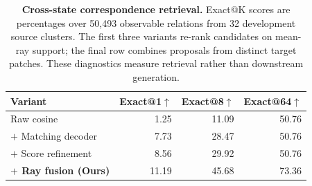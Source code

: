 \providecommand{\gearAblBest}[1]{\colorbox{gearAblBest}{#1}}
\providecommand{\gearAblSecond}[1]{\colorbox{gearAblSecond}{#1}}

\begin{table}[t]
\centering
\caption{\small
\textbf{Cross-state correspondence retrieval.}
Exact@K scores are percentages over 50,493 observable relations from 32
development source clusters. The first three variants re-rank candidates on
mean-ray support; the final row combines proposals from distinct target
patches. These diagnostics measure retrieval rather than downstream generation.
}
\label{tab:matching_ablation}
\begingroup
\footnotesize
\setlength{\tabcolsep}{2.2pt}
\setlength{\fboxsep}{0.7pt}
\renewcommand{\arraystretch}{1.11}
\begin{tabular}{@{}lrrr@{}}
\toprule
\textbf{Variant} & \textbf{Exact@1}$\uparrow$ & \textbf{Exact@8}$\uparrow$ & \textbf{Exact@64}$\uparrow$ \\
\midrule
Raw cosine & 1.25 & 11.09 & 50.76 \\
$+$ Matching decoder & 7.73 & 28.47 & 50.76 \\
$+$ Score refinement & \gearAblSecond{8.56} & \gearAblSecond{29.92} & 50.76 \\
\textbf{$+$ Ray fusion (Ours)} & \gearAblBest{11.19} & \gearAblBest{45.68} & \gearAblBest{73.36} \\
\bottomrule
\end{tabular}
\endgroup
\end{table}
